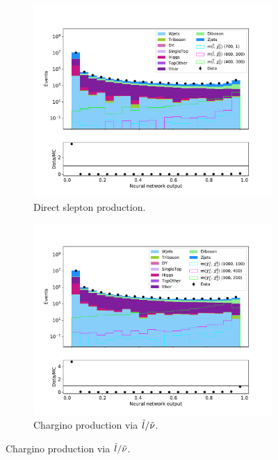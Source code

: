 \begin{figure}[H]
\begin{subfigure}[t!]{0.49\textwidth}
        \label{fig:SlepsnuNNLow}
    \end{subfigure}      
    \begin{subfigure}[t!]{0.49\textwidth}
        \includegraphics[width = \textwidth]{Figures/Stacked/stackedplot_NN_Low_level_slepslep.pdf}
        \caption{Direct slepton production.}
        \label{fig:SlepslepNNLow}
    \end{subfigure}
    \begin{subfigure}[t!]{0.49\textwidth}
        \includegraphics[width = \textwidth]{Figures/Stacked/stackedplot_NN_Low_level_slepsnu.pdf}
        \caption{Chargino production via $\Tilde{l}/\Tilde{\nu}$.}

\end{subfigure}
\end{figure}
